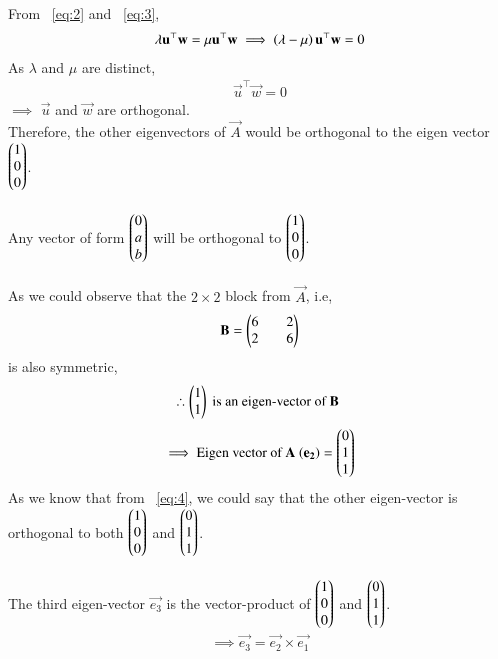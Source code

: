 \documentclass[journal]{IEEEtran}
\begin{document}
From ~\eqref{eq:2} and ~\eqref{eq:3},
\begin{align}
    \lambda\mathbf{u}^{\top}\mathbf{w}=\mu \mathbf{u}^{\top}\mathbf{w}
    \implies \left(\lambda-\mu\right)\mathbf{u}^{\top}\mathbf{w}=0
\end{align}
As $\lambda$ and $\mu$ are distinct,
\begin{align}
    \vec{u}^{\top}\vec{w}=0 \label{eq:4}
\end{align}
$\implies$ $\vec{u}$ and $\vec{w}$ are orthogonal.\\
Therefore, the other eigenvectors of $\vec{A}$ would be orthogonal to the eigen vector $\begin{pmatrix}1\\0\\0\end{pmatrix}$.\\
\\
Any vector of form $\begin{pmatrix}0\\a\\b\end{pmatrix}$ will be orthogonal to $\begin{pmatrix}1\\0\\0\end{pmatrix}$.\\
\\
As we could observe that the $2\times 2$ block from $\vec{A}$, i.e,
\begin{align}
    \mathbf{B}=\begin{pmatrix}6&&2\\2&&6\end{pmatrix}
\end{align}
is also symmetric,
\begin{align}
    \therefore \begin{pmatrix}1\\1\end{pmatrix} \text{ is an eigen-vector of $\mathbf{B}$ }
\end{align}
\begin{align}
      \implies \text{Eigen vector of $\mathbf{A}$ $\left(\mathbf{e_2}\right)$}=\begin{pmatrix}0\\1\\1\end{pmatrix}
\end{align}
As we know that from ~\eqref{eq:4}, we could say that the other eigen-vector is orthogonal to both $\begin{pmatrix}1\\0\\0\end{pmatrix}$ and $\begin{pmatrix}0\\1\\1\end{pmatrix}$.\\
\\
The third eigen-vector $\vec{e_3}$ is the vector-product of $\begin{pmatrix}1\\0\\0\end{pmatrix}$ and $\begin{pmatrix}0\\1\\1\end{pmatrix}$.
\begin{align}
    \implies \vec{e_3}=\vec{e_2} \times \vec{e_1}
\end{align}
\end{document}
